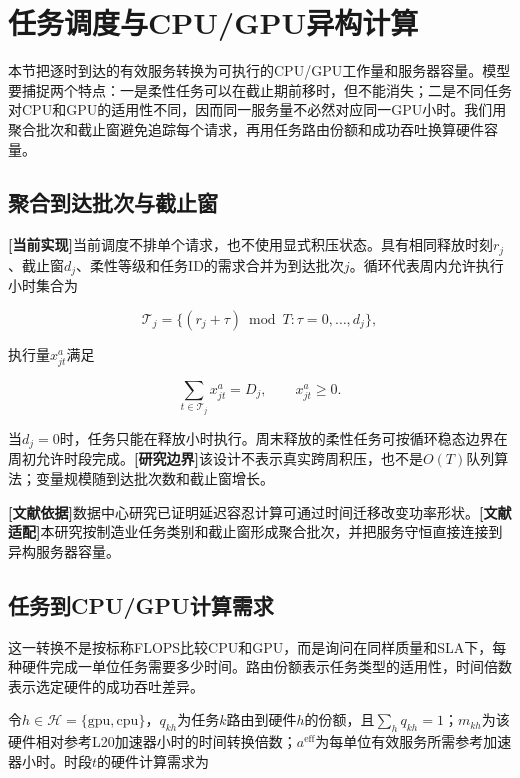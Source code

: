 \documentclass[preprint]{elsarticle}
\newcommand{\implemented}{\textcolor{green!40!black}{\textbf{[当前实现]}}}
\newcommand{\literature}{\textcolor{blue!70!black}{\textbf{[文献依据]}}}
\newcommand{\adapted}{\textcolor{violet!75!black}{\textbf{[文献适配]}}}
\newcommand{\boundary}{\textcolor{black!65}{\textbf{[研究边界]}}}
\newcommand{\Hset}{\mathcal H}
\begin{document}
\section{任务调度与CPU/GPU异构计算}

本节把逐时到达的有效服务转换为可执行的CPU/GPU工作量和服务器容量。模型要捕捉两个特点：一是柔性任务可以在截止期前移时，但不能消失；二是不同任务对CPU和GPU的适用性不同，因而同一服务量不必然对应同一GPU小时。我们用聚合批次和截止窗避免追踪每个请求，再用任务路由份额和成功吞吐换算硬件容量。

\subsection{聚合到达批次与截止窗}

\implemented 当前调度不排单个请求，也不使用显式积压状态。具有相同释放时刻$r_j$、截止窗$d_j$、柔性等级和任务ID的需求合并为到达批次$j$。循环代表周内允许执行小时集合为

\begin{equation}
 \mathcal T_j=\{(r_j+\tau)\bmod T:\tau=0,\ldots,d_j\},
 \label{eq:admissible-hours}
\end{equation}

执行量$x^a_{jt}$满足

\begin{equation}
 \sum_{t\in\mathcal T_j}x^a_{jt}=D_j,
 \qquad x^a_{jt}\geq0.
 \label{eq:job-conservation}
\end{equation}

当$d_j=0$时，任务只能在释放小时执行。周末释放的柔性任务可按循环稳态边界在周初允许时段完成。\boundary 该设计不表示真实跨周积压，也不是$O(T)$队列算法；变量规模随到达批次数和截止窗增长。

\literature 数据中心研究已证明延迟容忍计算可通过时间迁移改变功率形状。\adapted 本研究按制造业任务类别和截止窗形成聚合批次，并把服务守恒直接连接到异构服务器容量。

\subsection{任务到CPU/GPU计算需求}

这一转换不是按标称FLOPS比较CPU和GPU，而是询问在同样质量和SLA下，每种硬件完成一单位任务需要多少时间。路由份额表示任务类型的适用性，时间倍数表示选定硬件的成功吞吐差异。

令$h\in\Hset=\{\mathrm{gpu},\mathrm{cpu}\}$，$q_{kh}$为任务$k$路由到硬件$h$的份额，且$\sum_hq_{kh}=1$；$m_{kh}$为该硬件相对参考L20加速器小时的时间转换倍数；$a^{\mathrm{eff}}$为每单位有效服务所需参考加速器小时。时段$t$的硬件计算需求为
\end{document}
